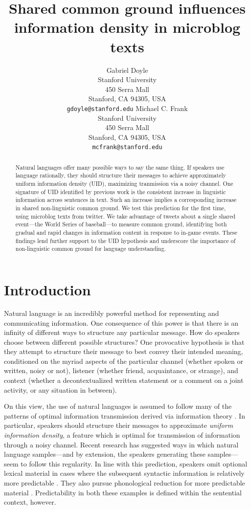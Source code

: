 \documentclass[11pt,letterpaper]{article}
\title{Shared common ground influences information density in microblog texts\Thanks{Thanks to...}}
\author{Gabriel Doyle\\
	    Stanford University\\
	    450 Serra Mall\\
	    Stanford, CA 94305, USA\\
	    {\tt gdoyle@stanford.edu}
	  \And
          Michael C. Frank\\
	    Stanford University\\
	    450 Serra Mall\\
	    Stanford, CA 94305, USA\\
	    {\tt mcfrank@stanford.edu}}
\date{}
\begin{document}
\maketitle
\begin{abstract}
Natural languages offer many possible ways to say the same thing. If speakers use language rationally, they should structure their messages to achieve approximately uniform information density (UID), maximizing tranmission via a noisy channel. One signature of UID identified by previous work is the consistent increase in linguistic information across sentences in text. Such an increase implies a corresponding increase in shared non-linguistic common ground. We test this prediction for the first time, using microblog texts from twitter. We take advantage of tweets about a single shared event---the World Series of baseball---to measure common ground, identifying both gradual and rapid changes in information content in response to in-game events. These findings lend further support to the UID hypothesis and underscore the importance of non-linguistic common ground for language understanding.
\end{abstract}

\section{Introduction}

Natural language is an incredibly powerful method for representing and communicating information. One consequence of this power is that there is an infinity of different ways to structure any particular message. How do speakers choose between different possible structures? One provocative hypothesis is that they attempt to structure their message to best convey their intended meaning, conditioned on the myriad aspects of the particular channel (whether spoken or written, noisy or not), listener (whether friend, acquaintance, or strange), and context (whether a decontextualized written statement or a comment on a joint activity, or any situation in between). 

On this view, the use of natural languages is assumed to follow many of the patterns of optimal information transmission derived via information theory \cite{shannon1948}. In particular, speakers should structure their messages to approximate \emph{uniform information density}, a feature which is optimal for transmission of information through a noisy channel. Recent research has suggested ways in which natural language samples---and by extension, the speakers generating these samples---seem to follow this regularity. In line with this prediction, speakers omit optional lexical material in cases where the subsequent syntactic information is relatively more predictable \cite{levy2007,frank2008,jaeger2010}. They also pursue phonological reduction for more predictable material \cite{aylett2004,aylett2006}. Predictability in both these examples is defined within the sentential context, however. 
\end{document}
